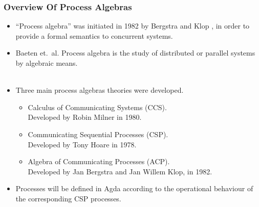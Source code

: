 \documentclass{beamer}
\begin{document}
\begin{frame}
\frametitle{Overview Of Process Algebras } %

\begin{itemize}
\item ``Process algebra'' was initiated in 1982 by Bergstra and Klop \cite{begstraKlop:FixedPointSemantics}, in order to provide a formal semantics to concurrent systems.

\end{itemize}

\begin{itemize}
\item Baeten et.~al.
 Process algebra is the study of distributed or parallel systems by algebraic means. \\~\\




\item Three main process algebras theories were developed.

\begin{itemize}

\item Calculus of Communicating Systems (CCS). \\
{\footnotesize Developed by Robin Milner in 1980.}

\item Communicating Sequential Processes (CSP). \\
{\footnotesize Developed by Tony Hoare in 1978.}

\item Algebra of Communicating Processes (ACP). \\
{\footnotesize Developed by Jan Bergstra and Jan Willem Klop, in 1982.}

\end{itemize}


\item Processes will be defined in Agda according to the operational behaviour of the corresponding CSP processes.

\end{itemize}
\end{frame}
\end{document}
